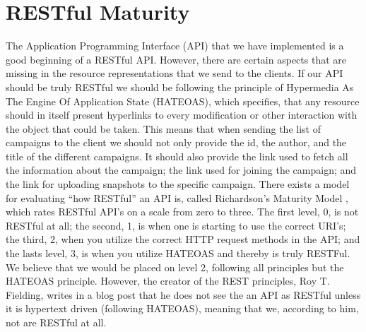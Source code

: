 
\section{RESTful Maturity}
\label{sec:restful_maturity}

The Application Programming Interface (API) that we have implemented is a good beginning of a RESTful API. However, there are certain aspects that are missing in the resource representations that we send to the clients. If our API should be truly RESTful we should be following the principle of Hypermedia As The Engine Of Application State (HATEOAS), which specifies, that any resource should in itself present hyperlinks to every modification or other interaction with the object that could be taken. This means that when sending the list of campaigns to the client we should not only provide the id, the author, and the title of the different campaigns. It should also provide the link used to fetch all the information about the campaign; the link used for joining the campaign; and the link for uploading snapshots to the specific campaign. There exists a model for evaluating ``how RESTful'' an API is, called Richardson's Maturity Model \parencite{richardsons_model}, which rates RESTful API's on a scale from zero to three. The first level, 0, is not RESTful at all; the second, 1, is when one is starting to use the correct URI's; the third, 2, when you utilize the correct HTTP request methods in the API; and the lasts level, 3, is when you utilize HATEOAS and thereby is truly RESTFul. We believe that we would be placed on level 2, following all principles but the HATEOAS principle. However, the creator of the REST principles, Roy T. Fielding, writes in a blog post that he does not see the an API as RESTful unless it is hypertext driven (following HATEOAS)\parencite{http_manden_blog}, meaning that we, according to him, not are RESTful at all. 
